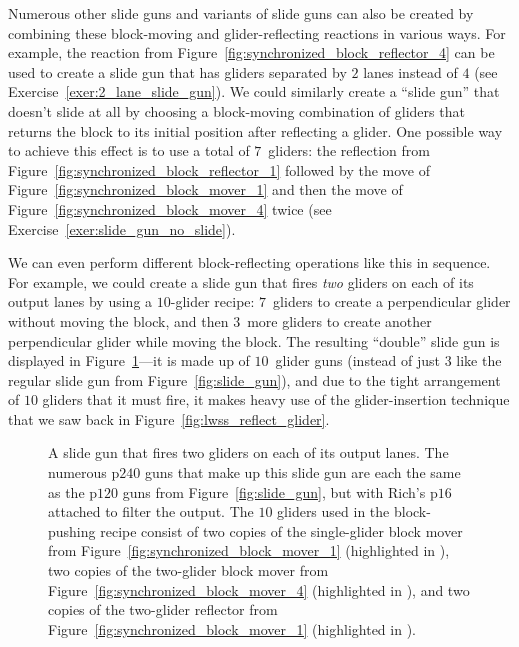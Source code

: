 Numerous other slide guns and variants of slide guns can also be created by combining these block-moving and glider-reflecting reactions in various ways. For example, the reaction from Figure~\ref{fig:synchronized_block_reflector_4} can be used to create a slide gun that has gliders separated by $2$ lanes instead of $4$ (see Exercise~\ref{exer:2_lane_slide_gun}). We could similarly create a ``slide gun'' that doesn't slide at all by choosing a block-moving combination of gliders that returns the block to its initial position after reflecting a glider. One possible way to achieve this effect is to use a total of $7$~gliders: the reflection from Figure~\ref{fig:synchronized_block_reflector_1} followed by the move of Figure~\ref{fig:synchronized_block_mover_1} and then the move of Figure~\ref{fig:synchronized_block_mover_4} twice (see Exercise~\ref{exer:slide_gun_no_slide}).

We can even perform different block-reflecting operations like this in sequence. For example, we could create a slide gun that fires \emph{two} gliders on each of its output lanes by using a $10$-glider recipe: $7$~gliders to create a perpendicular glider without moving the block, and then $3$~more gliders to create another perpendicular glider while moving the block. The resulting ``double'' slide gun is displayed in Figure~\ref{fig:double_slide_gun}---it is made up of $10$~glider guns (instead of just $3$ like the regular slide gun from Figure~\ref{fig:slide_gun}), and due to the tight arrangement of $10$ gliders that it must fire, it makes heavy use of the glider-insertion technique that we saw back in Figure~\ref{fig:lwss_reflect_glider}.

\begin{figure}[!htb]
	\centering
	\caption{A slide gun that fires two gliders on each of its output lanes. The numerous p$240$ guns that make up this slide gun are each the same as the p$120$ guns from Figure~\ref{fig:slide_gun}, but with Rich's p$16$ attached to filter the output. The $10$ gliders used in the block-pushing recipe consist of two copies of the single-glider block mover from Figure~\ref{fig:synchronized_block_mover_1} (highlighted in ), two copies of the two-glider block mover from Figure~\ref{fig:synchronized_block_mover_4} (highlighted in ), and two copies of the two-glider reflector from Figure~\ref{fig:synchronized_block_mover_1} (highlighted in ).}\label{fig:double_slide_gun}
\end{figure}

